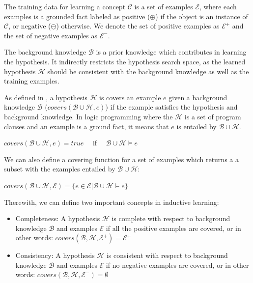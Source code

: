 The training data for learning a concept $\mathcal{C}$ is a set of examples $\mathcal{E}$, where each examples is a
grounded fact
labeled as positive ($\oplus$) if the object is an instance of $\mathcal{C}$, or negative ($\ominus$) otherwise. We
denote the set
of positive examples as $\mathcal{E}^{+}$ and the set of negative examples as $\mathcal{E}^{-}$.

The background knowledge $\mathcal{B}$ is a prior knowledge which contributes in learning the hypothesis. It
indirectly
restricts the hypothesis search space, as  the learned hypothesis $\mathcal{H}$ should be consistent with the
background
knowledge as well as the training examples.

As defined in \citet{DBLP:journals/ml/LavracD96}, a hypothesis $\mathcal{H}$ is covers an example $e$ given a
background knowledge $\mathcal{B}$ ($covers(\mathcal{B} \cup \mathcal{H},e)$) if the example satisfies the hypothesis
and background knowledge. In logic programming where the $\mathcal{H}$ is a set of program clauses and an example is a
ground fact, it means that $e$ is entailed by $\mathcal{B} \cup \mathcal{H}$.

\begin{center}
 $covers(\mathcal{B} \cup \mathcal{H},e)=true \quad$ if $\quad \mathcal{B} \cup \mathcal{H} \models e$
\end{center}

We can also define a covering function for a set of examples which returns a a subset with the examples entailed by
$\mathcal{B} \cup \mathcal{H}$:

\begin{center}
 $covers(\mathcal{B} \cup \mathcal{H},\mathcal{E})=\{e \in \mathcal{E} | \mathcal{B} \cup \mathcal{H} \models e\}$
\end{center}

Therewith, we can define two important concepts in inductive learning:

\begin{itemize}
 \item Completeness: A hypothesis $\mathcal{H}$ is complete with respect to background knowledge $\mathcal{B}$ and
examples $\mathcal{E}$ if all the positive examples are covered, or in other words:
$covers(\mathcal{B},\mathcal{H},\mathcal{E}^{+})=\mathcal{E}^{+}$
 \item Consistency: A hypothesis $\mathcal{H}$ is consistent with respect to background knowledge $\mathcal{B}$ and
examples $\mathcal{E}$ if no negative examples are covered, or in other words:
$covers(\mathcal{B},\mathcal{H},\mathcal{E}^{-})=\emptyset$
\end{itemize}

